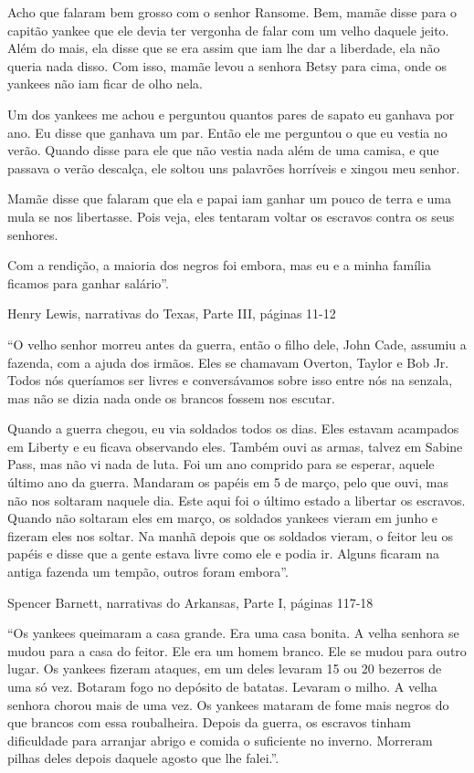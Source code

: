 Acho que falaram bem grosso com o senhor Ransome. Bem, mamãe disse para
o capitão yankee que ele devia ter vergonha de falar com um velho
daquele jeito. Além do mais, ela disse que se era assim que iam lhe dar
a liberdade, ela não queria nada disso. Com isso, mamãe levou a senhora
Betsy para cima, onde os yankees não iam ficar de olho nela.

Um dos yankees me achou e perguntou quantos pares de sapato eu ganhava
por ano. Eu disse que ganhava um par. Então ele me perguntou o que eu
vestia no verão. Quando disse para ele que não vestia nada além de uma
camisa, e que passava o verão descalça, ele soltou uns palavrões
horríveis e xingou meu senhor.

Mamãe disse que falaram que ela e papai iam ganhar um pouco de terra e
uma mula se nos libertasse. Pois veja, eles tentaram voltar os escravos
contra os seus senhores.

Com a rendição, a maioria dos negros foi embora, mas eu e a minha
família ficamos para ganhar salário''.

Henry Lewis, narrativas do Texas, Parte III, páginas 11-12

``O velho senhor morreu antes da guerra, então o filho dele, John Cade,
assumiu a fazenda, com a ajuda dos irmãos. Eles se chamavam Overton,
Taylor e Bob Jr. Todos nós queríamos ser livres e conversávamos sobre
isso entre nós na senzala, mas não se dizia nada onde os brancos fossem
nos escutar.

Quando a guerra chegou, eu via soldados todos os dias. Eles estavam
acampados em Liberty e eu ficava observando eles. Também ouvi as armas,
talvez em Sabine Pass, mas não vi nada de luta. Foi um ano comprido para
se esperar, aquele último ano da guerra. Mandaram os papéis em 5 de
março, pelo que ouvi, mas não nos soltaram naquele dia. Este aqui foi o
último estado a libertar os escravos. Quando não soltaram eles em março,
os soldados yankees vieram em junho e fizeram eles nos soltar. Na manhã
depois que os soldados vieram, o feitor leu os papéis e disse que a
gente estava livre como ele e podia ir. Alguns ficaram na antiga fazenda
um tempão, outros foram embora''.

Spencer Barnett, narrativas do Arkansas, Parte I, páginas 117-18

``Os yankees queimaram a casa grande. Era uma casa bonita. A velha
senhora se mudou para a casa do feitor. Ele era um homem branco. Ele se
mudou para outro lugar. Os yankees fizeram ataques, em um deles levaram
15 ou 20 bezerros de uma só vez. Botaram fogo no depósito de batatas.
Levaram o milho. A velha senhora chorou mais de uma vez. Os yankees
mataram de fome mais negros do que brancos com essa roubalheira. Depois
da guerra, os escravos tinham dificuldade para arranjar abrigo e comida
o suficiente no inverno. Morreram pilhas deles depois daquele agosto que
lhe falei.''.

